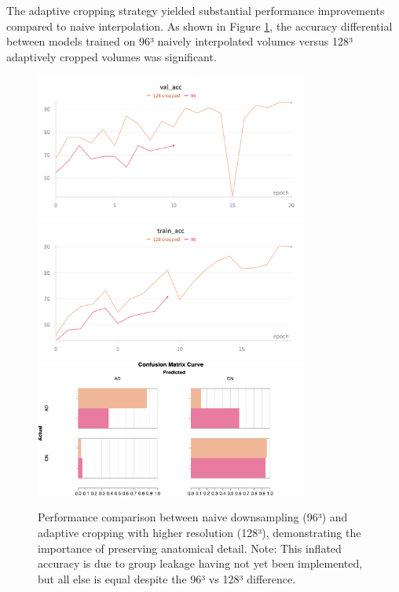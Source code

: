 \documentclass[11pt, a4paper]{article}
\begin{document}
The adaptive cropping strategy yielded substantial performance improvements compared to naive interpolation. As shown in Figure \ref{fig:cropping_impact}, the accuracy differential between models trained on 96³ naively interpolated volumes versus 128³ adaptively cropped volumes was significant.

\begin{figure}[htbp]
  \centering
  \includegraphics[width=0.8\textwidth]{figures/crop_val_acc.png}
  \includegraphics[width=0.8\textwidth]{figures/crop_train_acc.png}
  \includegraphics[width=0.8\textwidth]{figures/crop_CM.png}
  \caption{Performance comparison between naive downsampling (96³) and adaptive cropping with higher resolution (128³), demonstrating the importance of preserving anatomical detail. Note: This inflated accuracy is due to group leakage having not yet been implemented, but all else is equal despite the 96³ vs 128³ difference.}
  \label{fig:cropping_impact}
\end{figure}
\end{document}
